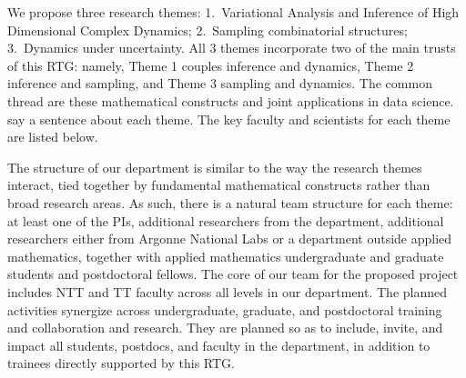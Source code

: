 \documentclass[11pt]{NSFamsart}
\begin{document}
We propose three research themes: 
1.\ Variational Analysis and Inference of High Dimensional Complex Dynamics; 
2.\ Sampling combinatorial structures; 
3.\ Dynamics under uncertainty. 
All 3 themes incorporate two of the main trusts of this RTG: namely, Theme 1 couples inference and dynamics, Theme 2 inference and sampling, and Theme 3 sampling and dynamics. The common thread are these mathematical constructs and joint applications in data science. {\color{magenta}say a sentence about each theme.} 
The key faculty and scientists for each theme are listed below.


The structure of our department is similar to the way the research themes interact, tied together by fundamental mathematical constructs rather than broad research areas. As such, there is a natural team structure for each theme:  at least one of the PIs,  additional researchers from the department, additional researchers either from Argonne National Labs or a department outside applied mathematics, %
together with applied mathematics undergraduate and graduate students and postdoctoral fellows.
The core of our team for the proposed project includes NTT and TT faculty across all levels in our department. The planned activities synergize across undergraduate, graduate, and postdoctoral training and collaboration and research. They are planned so as to include, invite, and impact all students, postdocs, and faculty in the department, in addition to trainees directly supported by this RTG. 
\end{document}

